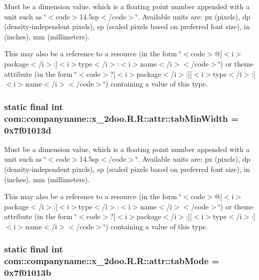 Must be a dimension value, which is a floating point number appended with a unit such as \char`\"{}$<$code$>$14.5sp$<$/code$>$\char`\"{}. Available units are: px (pixels), dp (density-independent pixels), sp (scaled pixels based on preferred font size), in (inches), mm (millimeters). 

This may also be a reference to a resource (in the form \char`\"{}$<$code$>$@\mbox{[}$<$i$>$package$<$/i$>$:\mbox{]}$<$i$>$type$<$/i$>$:$<$i$>$name$<$/i$>$$<$/code$>$\char`\"{}) or theme attribute (in the form \char`\"{}$<$code$>$?\mbox{[}$<$i$>$package$<$/i$>$:\mbox{]}\mbox{[}$<$i$>$type$<$/i$>$:\mbox{]}$<$i$>$name$<$/i$>$$<$/code$>$\char`\"{}) containing a value of this type. \hypertarget{classcom_1_1companyname_1_1x__2doo_1_1_r_1_1attr_684b24a1277fafd55a2a5daa6d2c2645}{
\subsubsection[{tabMinWidth}]{\setlength{\rightskip}{0pt plus 5cm}static final int com::companyname::x\_\-2doo.R.R::attr::tabMinWidth = 0x7f01013d}}
\label{classcom_1_1companyname_1_1x__2doo_1_1_r_1_1attr_684b24a1277fafd55a2a5daa6d2c2645}


Must be a dimension value, which is a floating point number appended with a unit such as \char`\"{}$<$code$>$14.5sp$<$/code$>$\char`\"{}. Available units are: px (pixels), dp (density-independent pixels), sp (scaled pixels based on preferred font size), in (inches), mm (millimeters). 

This may also be a reference to a resource (in the form \char`\"{}$<$code$>$@\mbox{[}$<$i$>$package$<$/i$>$:\mbox{]}$<$i$>$type$<$/i$>$:$<$i$>$name$<$/i$>$$<$/code$>$\char`\"{}) or theme attribute (in the form \char`\"{}$<$code$>$?\mbox{[}$<$i$>$package$<$/i$>$:\mbox{]}\mbox{[}$<$i$>$type$<$/i$>$:\mbox{]}$<$i$>$name$<$/i$>$$<$/code$>$\char`\"{}) containing a value of this type. \hypertarget{classcom_1_1companyname_1_1x__2doo_1_1_r_1_1attr_73f1c36a4a9de5b2fc10857f7dd1e233}{
\subsubsection[{tabMode}]{\setlength{\rightskip}{0pt plus 5cm}static final int com::companyname::x\_\-2doo.R.R::attr::tabMode = 0x7f01013b}}
\label{classcom_1_1companyname_1_1x__2doo_1_1_r_1_1attr_73f1c36a4a9de5b2fc10857f7dd1e233}


